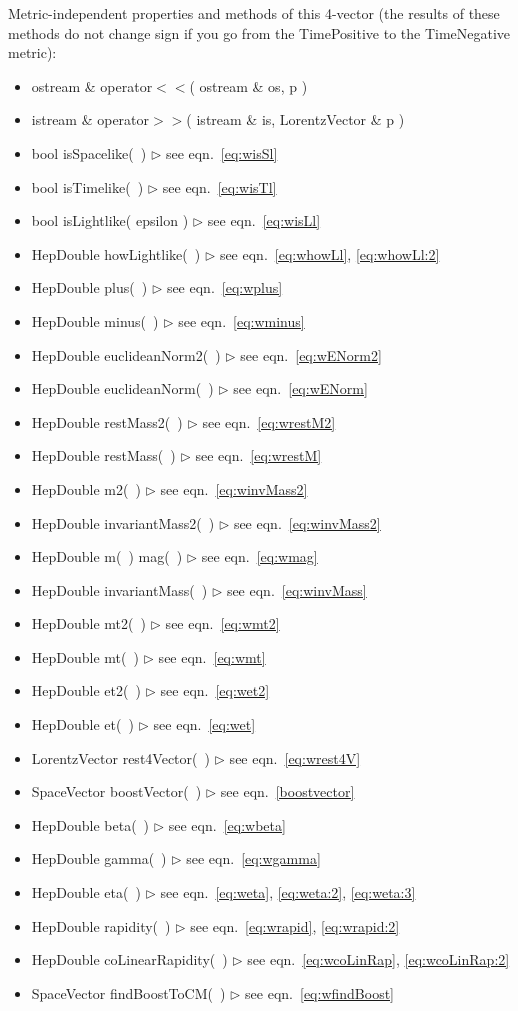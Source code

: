 \documentclass[twoside,12pt]{article}
\newcommand {\see}[1] {\hfill$\triangleright$ see eqn.~#1}
\newenvironment{shortlist}{%
\begin{itemize}
\setlength{\itemsep}{0pt}
\setlength{\parskip}{0pt}
}{%
\end{itemize}
}
\begin{document}
\noindent
Metric-independent properties and methods of this 4-vector
(the results of these methods do not change sign if you go from the
TimePositive to the TimeNegative metric):
\begin{shortlist}
  \item ostream \& operator$<<$( ostream \& os, p )
  \item istream \& operator$>>$( istream \& is, LorentzVector \& p )
  \item bool isSpacelike(~) \see{\ref{eq:wisSl}}
  \item bool isTimelike(~) \see{\ref{eq:wisTl}}
  \item bool isLightlike( epsilon ) \see{\ref{eq:wisLl}}
  \item HepDouble howLightlike(~) \see{\ref{eq:whowLl}, \ref{eq:whowLl:2}}
  \item HepDouble plus(~)  \see{\ref{eq:wplus}}
  \item HepDouble minus(~) \see{\ref{eq:wminus}}
  \item HepDouble euclideanNorm2(~)  \see{\ref{eq:wENorm2}}
  \item HepDouble euclideanNorm(~)  \see{\ref{eq:wENorm}}
  \item HepDouble restMass2(~) \see{\ref{eq:wrestM2}}
  \item HepDouble restMass(~) \see{\ref{eq:wrestM}}
  \item HepDouble m2(~) \see{\ref{eq:winvMass2}}
  \item HepDouble invariantMass2(~) \see{\ref{eq:winvMass2}}
  \item HepDouble m(~) \/\/\/ mag(~) \see{\ref{eq:wmag}}
  \item HepDouble invariantMass(~) \see{\ref{eq:winvMass}}
  \item HepDouble mt2(~) \see{\ref{eq:wmt2}}
  \item HepDouble mt(~) \see{\ref{eq:wmt}}
  \item HepDouble et2(~) \see{\ref{eq:wet2}}
  \item HepDouble et(~) \see{\ref{eq:wet}}
  \item LorentzVector rest4Vector(~) \see{\ref{eq:wrest4V}}
  \item SpaceVector boostVector(~) \see{\ref{boostvector}}
  \item HepDouble beta(~) \see{\ref{eq:wbeta}}
  \item HepDouble gamma(~) \see{\ref{eq:wgamma}}
  \item HepDouble eta(~) \see{\ref{eq:weta}, \ref{eq:weta:2}, \ref{eq:weta:3}}
  \item HepDouble rapidity(~) \see{\ref{eq:wrapid}, \ref{eq:wrapid:2}}
  \item HepDouble coLinearRapidity(~) \see{\ref{eq:wcoLinRap}, \ref{eq:wcoLinRap:2}}
  \item SpaceVector findBoostToCM(~) \see{\ref{eq:wfindBoost}}
\end{shortlist}
\end{document}
